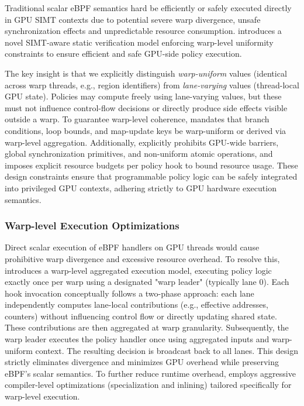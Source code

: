 Traditional scalar eBPF semantics hard be efficiently or safely executed directly in GPU SIMT contexts due to potential severe warp divergence, unsafe synchronization effects and unpredictable resource consumption. \sys introduces a novel SIMT-aware static verification model enforcing warp-level uniformity constraints to ensure efficient and safe GPU-side policy execution.

The key insight is that we explicitly distinguish \emph{warp-uniform} values (identical across warp threads, e.g., region identifiers) from \emph{lane-varying} values (thread-local GPU state). Policies may compute freely using lane-varying values, but these must not influence control-flow decisions or directly produce side effects visible outside a warp. To guarantee warp-level coherence, \sys mandates that branch conditions, loop bounds, and map-update keys be warp-uniform or derived via warp-level aggregation. Additionally, \sys explicitly prohibits GPU-wide barriers, global synchronization primitives, and non-uniform atomic operations, and imposes explicit resource budgets per policy hook to bound resource usage. These design constraints ensure that programmable policy logic can be safely integrated into privileged GPU contexts, adhering strictly to GPU hardware execution semantics.

\subsubsection{Warp-level Execution Optimizations}

Direct scalar execution of eBPF handlers on GPU threads would cause prohibitive warp divergence and excessive resource overhead. To resolve this, \sys introduces a warp-level aggregated execution model, executing policy logic exactly once per warp using a designated "warp leader" (typically lane 0). Each hook invocation conceptually follows a two-phase approach: each lane independently computes lane-local contributions (e.g., effective addresses, counters) without influencing control flow or directly updating shared state. These contributions are then aggregated at warp granularity. Subsequently, the warp leader executes the policy handler once using aggregated inputs and warp-uniform context. The resulting decision is broadcast back to all lanes. This design strictly eliminates divergence and minimizes GPU overhead while preserving eBPF's scalar semantics. To further reduce runtime overhead, \sys employs aggressive compiler-level optimizations (specialization and inlining) tailored specifically for warp-level execution.

